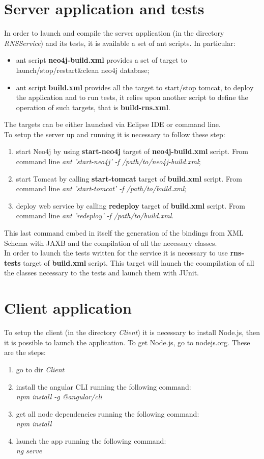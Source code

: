 \section{Server application and tests}
In order to launch and compile the server application (in the directory \textit{RNSService}) and its tests,  it is available a set of ant scripts. In particular:
\begin{itemize}
  \item ant script \textbf{neo4j-build.xml} provides a set of target to launch/stop/restart\&clean neo4j database;
  \item ant script \textbf{build.xml} provides all the target to start/stop tomcat, to deploy the application and to run tests, it relies upon another script to define the operation of such targets, that is \textbf{build-rns.xml}.
\end{itemize}
The targets can be either launched via Eclipse IDE or command line. \\
To setup the server up and running it is necessary to follow these step:
\begin{enumerate}
  \item start Neo4j by using \textbf{start-neo4j} target of \textbf{neo4j-build.xml} script. From command line \textit{ant 'start-neo4j' -f /path/to/neo4j-build.xml};
  \item start Tomcat by calling \textbf{start-tomcat} target of \textbf{build.xml} script. From command line \textit{ant 'start-tomcat' -f /path/to/build.xml};
  \item deploy web service by calling \textbf{redeploy} target of \textbf{build.xml} script. From command line \textit{ant 'redeploy' -f /path/to/build.xml}.
\end{enumerate}
This last command embed in itself the generation of the bindings from XML Schema with JAXB and the compilation of all the necessary classes.\\
In order to launch the tests written for the service it is necessary to use \textbf{rns-tests} target of \textbf{build.xml} script. This target will launch the coompilation of all the classes necessary to the tests and launch them with JUnit.

\section{Client application}
To setup the client (in the directory \textit{Client}) it is necessary to install Node.js, then it is possible to launch the application. To get Node.js, go to nodejs.org.
These are the steps:
\begin{enumerate}
	\item go to dir \textit{Client}
	\item install the angular CLI running the following command:\\ \textit{npm install -g @angular/cli} 
	\item get all node dependencies running the following command:\\ \textit{npm install} 
	\item launch the app running the following command:\\ \textit{ng serve}
\end{enumerate}